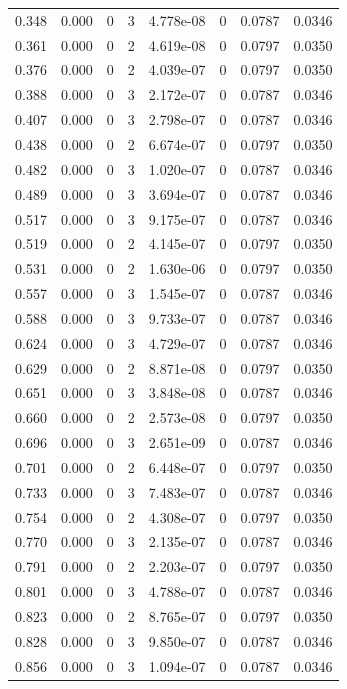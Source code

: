 \documentclass[preview]{standalone}
\begin{document}
{{\begin{tabular}{L{1.2cm}C{1.2cm} C{0.3cm}C{0.5cm} C{1.4cm}C{1.4cm} C{1.4cm}C{1.4cm}}
  0.348  &  0.000  & 0     &  3 &  4.778e-08  & 0  & 0.0787 &  0.0346   \\ 
  0.361  &  0.000  & 0     &  2 &  4.619e-08  & 0  & 0.0797 &  0.0350   \\ 
  0.376  &  0.000  & 0     &  2 &  4.039e-07  & 0  & 0.0797 &  0.0350   \\ 
  0.388  &  0.000  & 0     &  3 &  2.172e-07  & 0  & 0.0787 &  0.0346   \\ 
  0.407  &  0.000  & 0     &  3 &  2.798e-07  & 0  & 0.0787 &  0.0346   \\ 
  0.438  &  0.000  & 0     &  2 &  6.674e-07  & 0  & 0.0797 &  0.0350   \\ 
  0.482  &  0.000  & 0     &  3 &  1.020e-07  & 0  & 0.0787 &  0.0346   \\ 
  0.489  &  0.000  & 0     &  3 &  3.694e-07  & 0  & 0.0787 &  0.0346   \\ 
  0.517  &  0.000  & 0     &  3 &  9.175e-07  & 0  & 0.0787 &  0.0346   \\ 
  0.519  &  0.000  & 0     &  2 &  4.145e-07  & 0  & 0.0797 &  0.0350   \\ 
  0.531  &  0.000  & 0     &  2 &  1.630e-06  & 0  & 0.0797 &  0.0350   \\ 
  0.557  &  0.000  & 0     &  3 &  1.545e-07  & 0  & 0.0787 &  0.0346   \\ 
  0.588  &  0.000  & 0     &  3 &  9.733e-07  & 0  & 0.0787 &  0.0346   \\ 
  0.624  &  0.000  & 0     &  3 &  4.729e-07  & 0  & 0.0787 &  0.0346   \\ 
  0.629  &  0.000  & 0     &  2 &  8.871e-08  & 0  & 0.0797 &  0.0350   \\ 
  0.651  &  0.000  & 0     &  3 &  3.848e-08  & 0  & 0.0787 &  0.0346   \\ 
  0.660  &  0.000  & 0     &  2 &  2.573e-08  & 0  & 0.0797 &  0.0350   \\ 
  0.696  &  0.000  & 0     &  3 &  2.651e-09  & 0  & 0.0787 &  0.0346   \\ 
  0.701  &  0.000  & 0     &  2 &  6.448e-07  & 0  & 0.0797 &  0.0350   \\ 
  0.733  &  0.000  & 0     &  3 &  7.483e-07  & 0  & 0.0787 &  0.0346   \\ 
  0.754  &  0.000  & 0     &  2 &  4.308e-07  & 0  & 0.0797 &  0.0350   \\ 
  0.770  &  0.000  & 0     &  3 &  2.135e-07  & 0  & 0.0787 &  0.0346   \\ 
  0.791  &  0.000  & 0     &  2 &  2.203e-07  & 0  & 0.0797 &  0.0350   \\ 
  0.801  &  0.000  & 0     &  3 &  4.788e-07  & 0  & 0.0787 &  0.0346   \\ 
  0.823  &  0.000  & 0     &  2 &  8.765e-07  & 0  & 0.0797 &  0.0350   \\ 
  0.828  &  0.000  & 0     &  3 &  9.850e-07  & 0  & 0.0787 &  0.0346   \\ 
  0.856  &  0.000  & 0     &  3 &  1.094e-07  & 0  & 0.0787 &  0.0346   \\ 
\hline 
\end{tabular} 

}}
\end{document}
